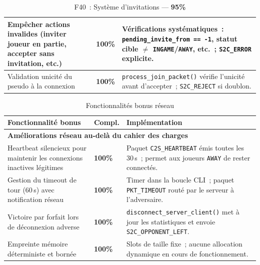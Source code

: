 \documentclass[a4paper]{article}
\begin{document}
\begin{table}[H]
\begin{tabular}{|p{6cm}|p{1.5cm}|p{8cm}|}
\hline
Empêcher actions invalides (inviter joueur en partie, accepter sans invitation, etc.)
& \textbf{100\%}
& Vérifications systématiques~: \texttt{pending\_invite\_from == -1}, statut cible $\neq$ \texttt{INGAME}/\texttt{AWAY}, etc.~; \texttt{S2C\_ERROR} explicite. \\
\hline
Validation unicité du pseudo à la connexion
& \textbf{100\%}
& \texttt{process\_join\_packet()} vérifie l'unicité avant d'accepter~; \texttt{S2C\_REJECT} si doublon. \\
\hline
\end{tabular}
\caption{F40~: Système d'invitations --- \textbf{95\%}}
\label{tab:f40}
\end{table}
 
 
\begin{table}[H]
\centering
\renewcommand{\arraystretch}{1.4}
\begin{tabular}{|p{6cm}|p{1.5cm}|p{8cm}|}
\hline
\textbf{Fonctionnalité bonus} & \textbf{Compl.} & \textbf{Implémentation} \\
\hline
\multicolumn{3}{|l|}{\textbf{Améliorations réseau au-delà du cahier des charges}} \\
\hline
Heartbeat silencieux pour maintenir les connexions inactives légitimes
& \textbf{100\%}
& Paquet \texttt{C2S\_HEARTBEAT} émis toutes les 30\,s~; permet aux joueurs \texttt{AWAY} de rester connectés. \\
\hline
Gestion du timeout de tour (60\,s) avec notification réseau
& \textbf{100\%}
& Timer dans la boucle CLI~; paquet \texttt{PKT\_TIMEOUT} routé par le serveur à l'adversaire. \\
\hline
Victoire par forfait lors de déconnexion adverse
& \textbf{100\%}
& \texttt{disconnect\_server\_client()} met à jour les statistiques et envoie \texttt{S2C\_OPPONENT\_LEFT}. \\
\hline
Empreinte mémoire déterministe et bornée
& \textbf{100\%}
& Slots de taille fixe~; aucune allocation dynamique en cours de fonctionnement. \\
\hline
\end{tabular}
\caption{Fonctionnalités bonus réseau}
\label{tab:bonus-reseau}
\end{table}
 
 
\end{document}

